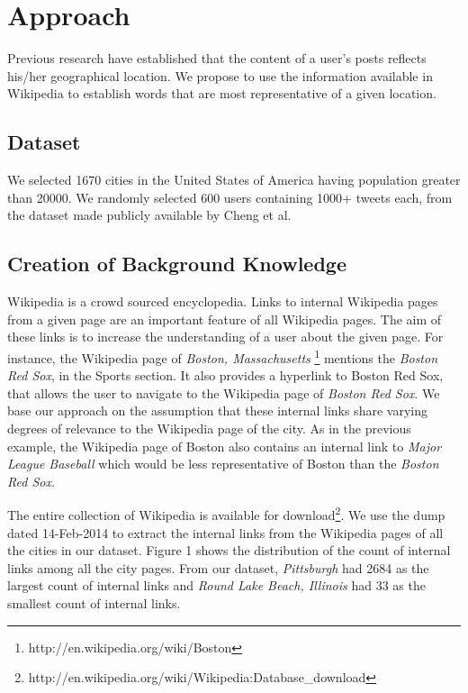  
\section{Approach}
\label{sec:approach}
Previous research \cite{cheng2010you} \cite{bo2012geolocation} have established that the content of a user's posts reflects his/her geographical location. We propose to use the information available in Wikipedia to establish words that are most representative of a given location. 

\subsection{Dataset}
We selected 1670 cities in the United States of America having population greater than 20000. We randomly selected 600 users containing 1000+ tweets each, from the dataset made publicly available by Cheng et al\cite{cheng2010you}.

\subsection{Creation of Background Knowledge}
Wikipedia is a crowd sourced encyclopedia. Links to internal Wikipedia pages from a given page are an important feature of all Wikipedia pages. The aim of these links is to increase the understanding of a user about the given page. For instance, the Wikipedia page of \textit{Boston, Massachusetts} \footnote{http://en.wikipedia.org/wiki/Boston} mentions the \textit{Boston Red Sox}, in the Sports section. It also provides a hyperlink to Boston Red Sox, that allows the user to navigate to the Wikipedia page of \textit{Boston Red Sox}. We base our approach on the assumption that these internal links share varying degrees of relevance to the Wikipedia page of the city. As in the previous example, the Wikipedia page of Boston also contains an internal link to \textit{Major League Baseball} which would be less representative of Boston than the \textit{Boston Red Sox}. 

The entire collection of Wikipedia is available for download\footnote{http://en.wikipedia.org/wiki/Wikipedia:Database\_download}. We use the dump dated 14-Feb-2014 to extract the internal links from the Wikipedia pages of all the cities in our dataset. Figure 1 shows the distribution of the count of internal links among all the city pages. From our dataset, \textit{Pittsburgh} had 2684 as the largest count of internal links and \textit{Round Lake Beach, Illinois} had 33 as the smallest count of internal links.

